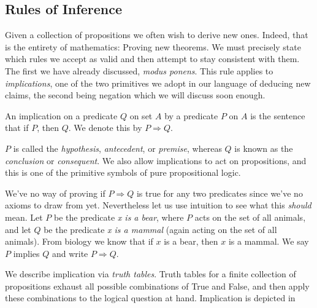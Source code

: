     \subsection{Rules of Inference}
        Given a collection of propositions we often wish to derive new ones.
        Indeed, that is the entirety of mathematics: Proving new theorems. We
        must precisely state which rules we accept as valid and then attempt to
        stay consistent with them. The first we have already discussed,
        \textit{modus ponens}. This rule applies to \textit{implications}, one
        of the two primitives we adopt in our language of deducing new claims,
        the second being negation which we will discuss soon enough.
        \begin{definition}
            \label{def:Implication}%
            An \gls{implication} on a \gls{predicate} $Q$ on \gls{set} $A$ by a
            predicate $P$ on $A$ is the sentence that if $P$, then $Q$. We
            denote this by $P\Rightarrow{Q}$.
        \end{definition}
        $P$ is called the \textit{hypothesis},
        \textit{antecedent}, or
        \textit{premise}, whereas $Q$ is known as the
        \textit{conclusion} or
        \textit{consequent}. We also allow implications to
        act on propositions, and this is one of the primitive symbols of
        pure propositional logic.
        \begin{example}
            \label{ex:Implication_Mammals}%
            We've no way of proving if $P\Rightarrow{Q}$ is true for any two
            predicates since we've no axioms to draw from yet. Nevertheless let
            us use intuition to see what this \textit{should} mean. Let $P$ be
            the predicate \textit{x is a bear}, where $P$ acts on the set
            of all animals, and let $Q$ be the predicate \textit{x is a mammal}
            (again acting on the set of all animals). From biology we know that
            if $x$ is a bear, then $x$ is a mammal. We say $P$ implies $Q$ and
            write $P\Rightarrow{Q}$.
        \end{example}
        We describe implication via \textit{truth tables}.
        Truth tables for a finite collection of propositions exhaust all
        possible combinations of True and False, and then apply these
        combinations to the logical question at hand. Implication is depicted in
